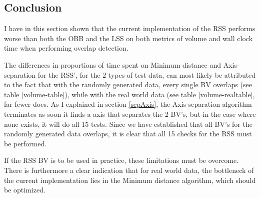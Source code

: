 \subsection{Conclusion}
I have in this section shown that the current implementation of the RSS performs worse than both the OBB and the LSS on both metrics of volume and wall clock time when performing overlap detection.

The differences in proportions of time spent on Minimum distance and Axis-separation for the RSS', for the 2 types of test data, can most likely be attributed to the fact that with the randomly generated data, every single BV overlaps (see table \ref{volume-table}), while with the real world data (see table \ref{volume-realtable}, far fewer does. As I explained in section \ref{sepAxis}, the Axis-separation algorithm terminates as soon it finds a axis that separates the 2 BV's, but in the case where none exists, it will do all 15 tests. Since we have established that all BV's for the randomly generated data overlaps, it is clear that all 15 checks for the RSS must be performed.  

If the RSS BV is to be used in practice, these limitations must be overcome. There is furthermore a clear indication that for real world data, the bottleneck of the current implementation lies in the Minimum distance algorithm, which should be optimized.
